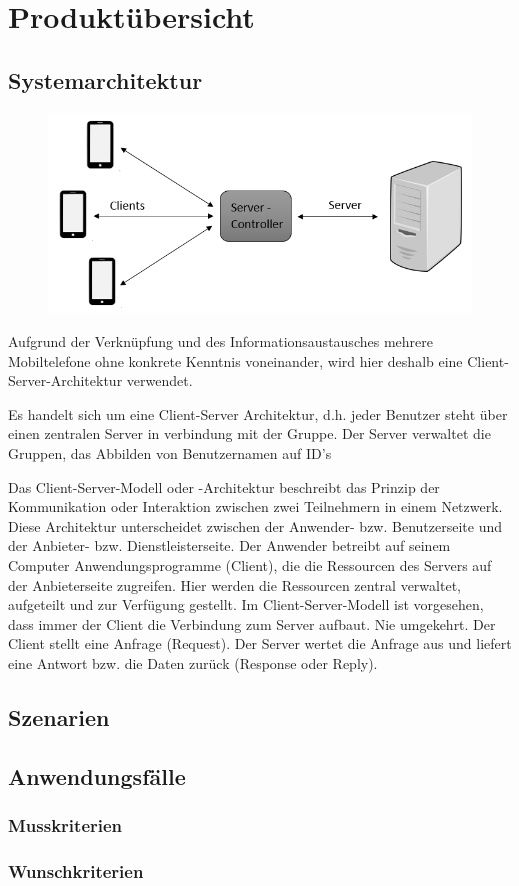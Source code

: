 \section{Produktübersicht}
\subsection{Systemarchitektur}

\begin{figure} [h]	
	\centering
	\includegraphics[scale = 0.8]{res/clientServerArchitektur.png}
\end{figure}

Aufgrund der Verknüpfung und des Informationsaustausches mehrere Mobiltelefone ohne konkrete Kenntnis 
voneinander, wird hier deshalb eine Client-Server-Architektur verwendet.

Es handelt sich um eine Client-Server Architektur, d.h. jeder Benutzer         
steht über einen zentralen Server in verbindung mit der Gruppe.
Der Server verwaltet die Gruppen, das Abbilden von Benutzernamen auf ID's
 
Das Client-Server-Modell oder -Architektur beschreibt das Prinzip der Kommunikation 
oder Interaktion zwischen zwei Teilnehmern in einem Netzwerk.
Diese Architektur unterscheidet zwischen der Anwender- bzw. Benutzerseite und der 
Anbieter- bzw. Dienstleisterseite. Der Anwender betreibt auf seinem Computer 
Anwendungsprogramme (Client), die die Ressourcen des Servers auf der Anbieterseite
zugreifen. Hier werden die Ressourcen zentral verwaltet, aufgeteilt und zur 
Verfügung gestellt.
Im Client-Server-Modell ist vorgesehen, dass immer der Client die Verbindung zum 
Server aufbaut. Nie umgekehrt. Der Client stellt eine Anfrage (Request). Der Server 
wertet die Anfrage aus und liefert eine Antwort bzw. die Daten zurück (Response oder Reply).
 


\subsection{Szenarien}
\subsection{Anwendungsfälle}
\subsubsection{Musskriterien}
\subsubsection{Wunschkriterien}